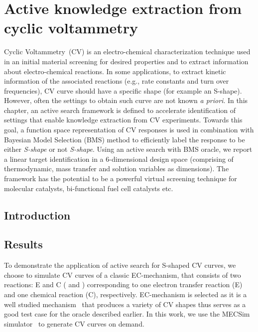\chapter{Active knowledge extraction from cyclic voltammetry}\label{chapter3}
Cyclic Voltammetry~(CV) is an electro-chemical characterization technique used in an initial material screening for desired properties and to extract information about electro-chemical reactions.
In some applications, to extract kinetic information of the associated reactions (e.g., rate constants and turn over frequencies), CV curve should have a specific shape (for example an S-shape). 
However, often the settings to obtain such curve are not known \textit{a priori}. 
In this chapter, an active search framework is defined to accelerate identification of settings that enable knowledge extraction from CV experiments.
Towards this goal, a function space representation of CV responses is used in combination with Bayesian Model Selection (BMS) method to efficiently label the response to be either \textit{S-shape} or not \textit{S-shape}. 
Using an active search with BMS oracle, we report a linear target identification in a 6-dimensional design space (comprising of thermodynamic, mass transfer and solution variables as dimensions). 
The framework has the potential to be a powerful virtual screening technique for molecular catalysts, bi-functional fuel cell catalysts etc.


\section{Introduction}





\section{Results}
To demonstrate the application of active search for S-shaped CV curves, we choose to simulate CV curves of a classic EC-mechanism, that consists of two reactions: E and C ( and ) corresponding to one electron transfer reaction (E) and one chemical reaction (C), respectively. 
EC-mechanism is selected as it is a well studied mechanism~\cite{rountree2014evaluation, costentin2015cyclic} that produces a variety of CV shapes thus serves as a good test case for the oracle described earlier. 
In this work, we use the MECSim simulator~\cite{MECSim} to generate CV curves on demand. 

